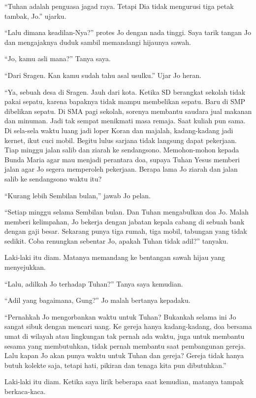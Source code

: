 ``Tuhan adalah penguasa jagad raya. Tetapi Dia tidak mengurusi tiga petak tambak, Jo.'' ujarku.

``Lalu dimana keadilan-Nya?'' protes Jo dengan nada tinggi.
Saya tarik  tangan Jo dan mengajaknya duduk sambil memandangi hijaunya sawah.

``Jo, kamu asli mana?'' Tanya saya. 

``Dari Sragen. Kan kamu sudah tahu asal usulku.'' Ujar Jo heran.

``Ya, sebuah desa di Sragen. Jauh dari kota. Ketika SD berangkat sekolah tidak pakai sepatu, karena bapaknya tidak mampu membelikan sepatu. Baru di SMP dibelikan sepatu. Di SMA pagi sekolah, sorenya membantu saudara jual makanan dan minuman. Jadi tak sempat menikmati masa remaja. Saat kuliah pun sama. Di sela-sela waktu luang jadi loper Koran dan majalah, kadang-kadang jadi kernet, ikut cuci mobil. Begitu lulus sarjana tidak langsung dapat pekerjaan. Tiap minggu jalan salib dan ziarah ke sendangsono. Memohon-mohon kepada Bunda Maria agar mau menjadi perantara doa, supaya Tuhan Yesus memberi jalan agar Jo segera memperoleh pekerjaan. Berapa lama Jo ziarah dan jalan salib ke sendangsono waktu itu?

``Kurang lebih Sembilan bulan,'' jawab Jo pelan.

``Setiap minggu selama Sembilan bulan. Dan Tuhan mengabulkan doa Jo. Malah memberi kelimpahan, Jo bekerja dengan jabatan kepala cabang di sebuah bank dengan gaji besar. Sekarang punya tiga rumah, tiga mobil, tabungan yang tidak sedikit. Coba renungkan sebentar Jo, apakah Tuhan tidak adil?'' tanyaku.

Laki-laki itu diam. Matanya memandang ke bentangan sawah hijau yang menyejukkan.

``Lalu, adilkah Jo terhadap Tuhan?'' Tanya saya kemudian.

``Adil yang bagaimana, Gung?'' Jo malah bertanya kepadaku.

``Pernahkah Jo mengorbankan waktu untuk Tuhan? Bukankah selama ini Jo sangat sibuk dengan mencari uang. Ke gereja hanya kadang-kadang, doa bersama umat di wilayah atau lingkungan tak pernah ada waktu, juga untuk membantu sesama yang membutuhkan, tidak pernah membantu saat pembangunan gereja. Lalu kapan Jo akan punya waktu untuk Tuhan dan gereja? Gereja tidak hanya butuh kolekte saja, tetapi hati, pikiran dan tenaga kita pun dibutuhkan.''  

Laki-laki itu diam. Ketika saya lirik beberapa saat kemudian, matanya tampak berkaca-kaca.

